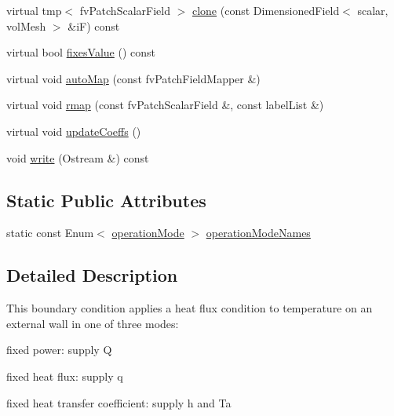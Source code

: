 \begin{DoxyCompactItemize}
\item 
virtual tmp$<$ fv\+Patch\+Scalar\+Field $>$ \hyperlink{classFoam_1_1coupledWallHeatFluxTemperatureFvPatchScalarField_a617bc55e78cf53196df9217431e5aa96}{clone} (const Dimensioned\+Field$<$ scalar, vol\+Mesh $>$ \&iF) const
\item 
virtual bool \hyperlink{classFoam_1_1coupledWallHeatFluxTemperatureFvPatchScalarField_a0de932061a01f71d2b747c01a4d1a467}{fixes\+Value} () const
\item 
virtual void \hyperlink{classFoam_1_1coupledWallHeatFluxTemperatureFvPatchScalarField_a0ab0c43ce90d756c88dd81e3d0a9eef5}{auto\+Map} (const fv\+Patch\+Field\+Mapper \&)
\item 
virtual void \hyperlink{classFoam_1_1coupledWallHeatFluxTemperatureFvPatchScalarField_a713277715ccc0a5ef466b0516d44731f}{rmap} (const fv\+Patch\+Scalar\+Field \&, const label\+List \&)
\item 
virtual void \hyperlink{classFoam_1_1coupledWallHeatFluxTemperatureFvPatchScalarField_a7e24eafac629d3733181cd942d4c902f}{update\+Coeffs} ()
\item 
void \hyperlink{classFoam_1_1coupledWallHeatFluxTemperatureFvPatchScalarField_a293fdfec8bdfbd5c3913ab4c9f3454ff}{write} (Ostream \&) const
\end{DoxyCompactItemize}
\subsection*{Static Public Attributes}
\begin{DoxyCompactItemize}
\item 
static const Enum$<$ \hyperlink{classFoam_1_1coupledWallHeatFluxTemperatureFvPatchScalarField_a9b481872591aae7acc301acf3cf5a26d}{operation\+Mode} $>$ \hyperlink{classFoam_1_1coupledWallHeatFluxTemperatureFvPatchScalarField_a19c1c49fe71d72365dc6f6daae30b95b}{operation\+Mode\+Names}
\end{DoxyCompactItemize}


\subsection{Detailed Description}
This boundary condition applies a heat flux condition to temperature on an external wall in one of three modes\+: 

\label{_Description}%

\begin{DoxyItemize}
\item fixed power\+: supply Q
\item fixed heat flux\+: supply q
\item fixed heat transfer coefficient\+: supply h and Ta
\end{DoxyItemize}

